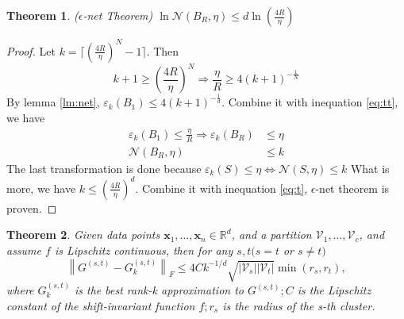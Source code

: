 \documentclass[12pt, a4paper, oneside]{article}
\newtheorem{theorem}{Theorem}
\begin{document}
\begin{theorem}
	\label{thm:net}
	($\epsilon$-net Theorem) $\ln \mathcal{N}\left(B_{R}, \eta\right) \leq d \ln \left(\frac{4 R}{\eta}\right)$
\end{theorem}

\begin{proof}
	Let $k=\lceil\left(\frac{4 R}{\eta}\right)^{N}-1\rceil$. Then 
	\begin{equation}
		\label{eq:tt}
		k+1 \geq\left(\frac{4 R}{\eta}\right)^{N}
		\Rightarrow \frac{\eta}{R} \geq 4(k+1)^{-\frac1N}
	\end{equation}
	By lemma \ref{lm:net}, $\varepsilon_{k}\left(B_{1}\right) \leq 4(k+1)^{-\frac{1}{d}}$. Combine it with inequation \ref{eq:tt}, we have
	\begin{equation}
		\label{eq:t}
		\begin{aligned}
			\varepsilon_{k}\left(B_{1}\right) \leq \frac{\eta}{R} \Rightarrow
			\varepsilon_{k}\left(B_{R}\right) &\leq \eta \\
			\mathcal{N}(B_R, \eta) &\leq k
		\end{aligned}
	\end{equation}
	The last transformation is done because $\varepsilon_{k}(S) \leq \eta \Longleftrightarrow \mathcal{N}(S, \eta) \leq k$
	What is more, we have $k \leq (\frac{4R}{\eta})^d$. Combine it with inequation \ref{eq:t}, $\epsilon$-net theorem is proven.
\end{proof}

\begin{theorem}
	\label{thm:last}
	Given data points $\boldsymbol{x}_{1}, \ldots, \boldsymbol{x}_{n} \in \mathbb{R}^{d}$, and a partition $\mathcal{V}_{1}, \ldots, \mathcal{V}_{c}$, and assume $f$ is Lipschitz continuous, then for any $s, t(s=t$ or $s \neq t)$
	$$
	\left\|G^{(s, t)}-G_{k}^{(s, t)}\right\|_{F} \leq 4 C k^{-1 / d} \sqrt{\left|\mathcal{V}_{s}\right|\left|\mathcal{V}_{t}\right|} \min \left(r_{s}, r_{t}\right),
	$$
	where $G_{k}^{(s, t)}$ is the best rank-k approximation to $G^{(s, t)} ; C$ is the Lipschitz constant of the shift-invariant function $f ; r_{s}$ is the radius of the s-th cluster.
\end{theorem}
\end{document}
